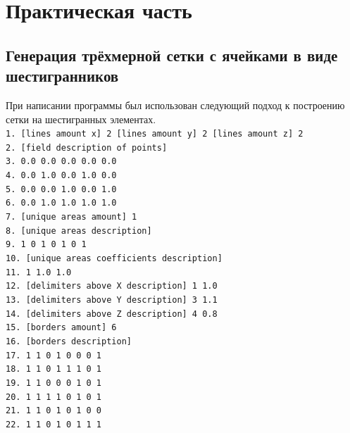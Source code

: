 \chapter{Практическая часть}

\section{Генерация трёхмерной сетки с ячейками в виде шестигранников}

При написании программы был использован следующий подход к построению сетки на шестигранных элементах.\\
\texttt{\hspace*{0.5em}1. [lines amount x] 2 [lines amount y] 2 [lines amount z] 2\\}
\texttt{\hspace*{0.5em}2. [field description of points]\\}
\texttt{\hspace*{0.5em}3. 0.0 0.0 0.0  0.0 0.0\\}
\texttt{\hspace*{0.5em}4. 0.0 1.0 0.0  1.0 0.0\\}
\texttt{\hspace*{0.5em}5. 0.0 0.0 1.0  0.0 1.0\\}
\texttt{\hspace*{0.5em}6. 0.0 1.0 1.0  1.0 1.0\\}	
\texttt{\hspace*{0.5em}7. [unique areas amount] 1\\}
\texttt{\hspace*{0.5em}8. [unique areas description]\\}
\texttt{\hspace*{0.5em}9. 1 0 1 0 1 0 1\\}
\texttt{10. [unique areas coefficients description]\\}
\texttt{11. 1 1.0 1.0\\}
\texttt{12. [delimiters above X description] 1 1.0\\} 
\texttt{13. [delimiters above Y description] 3 1.1\\}
\texttt{14. [delimiters above Z description] 4 0.8\\}
\texttt{15. [borders amount] 6\\}
\texttt{16. [borders description]\\}
\texttt{17. 1 1 0 1 0 0 0 1\\}
\texttt{18. 1 1 0 1 1 1 0 1\\}
\texttt{19. 1 1 0 0 0 1 0 1\\}
\texttt{20. 1 1 1 1 0 1 0 1\\}
\texttt{21. 1 1 0 1 0 1 0 0\\}
\texttt{22. 1 1 0 1 0 1 1 1\\}

